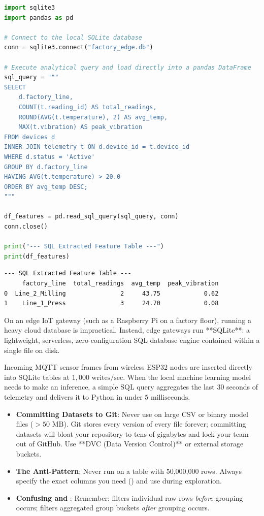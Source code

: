 \begin{lstlisting}[language=Python]
import sqlite3
import pandas as pd

# Connect to the local SQLite database
conn = sqlite3.connect("factory_edge.db")

# Execute analytical query and load directly into a pandas DataFrame
sql_query = """
SELECT 
    d.factory_line,
    COUNT(t.reading_id) AS total_readings,
    ROUND(AVG(t.temperature), 2) AS avg_temp,
    MAX(t.vibration) AS peak_vibration
FROM devices d
INNER JOIN telemetry t ON d.device_id = t.device_id
WHERE d.status = 'Active'
GROUP BY d.factory_line
HAVING AVG(t.temperature) > 20.0
ORDER BY avg_temp DESC;
"""

df_features = pd.read_sql_query(sql_query, conn)
conn.close()

print("--- SQL Extracted Feature Table ---")
print(df_features)
\end{lstlisting}

\begin{lstlisting}[style=outputstyle]
--- SQL Extracted Feature Table ---
     factory_line  total_readings  avg_temp  peak_vibration
0  Line_2_Milling               2     43.75            0.62
1    Line_1_Press               3     24.70            0.08
\end{lstlisting}

\begin{iotbox}
On an edge IoT gateway (such as a Raspberry Pi on a factory floor), running a heavy cloud database is impractical. Instead, edge gateways run **SQLite**: a lightweight, serverless, zero-configuration SQL database engine contained within a single file on disk. 

Incoming MQTT sensor frames from wireless ESP32 nodes are inserted directly into SQLite tables at $1{,}000\text{ writes/sec}$. When the local machine learning model needs to make an inference, a simple SQL query aggregates the last 30 seconds of telemetry and delivers it to Python in under $5\text{ milliseconds}$.
\end{iotbox}

\begin{warning}
\begin{itemize}
    \item \textbf{Committing Datasets to Git}: Never use  on large CSV or binary model files ($> 50\text{ MB}$). Git stores every version of every file forever; committing datasets will bloat your repository to tens of gigabytes and lock your team out of GitHub. Use **DVC (Data Version Control)** or external storage buckets.
    \item \textbf{The  Anti-Pattern}: Never run  on a table with 50,000,000 rows. Always specify the exact columns you need () and use  during exploration.
    \item \textbf{Confusing  and }: Remember:  filters individual raw rows \textit{before} grouping occurs;  filters aggregated group buckets \textit{after} grouping occurs.
\end{itemize}
\end{warning}


